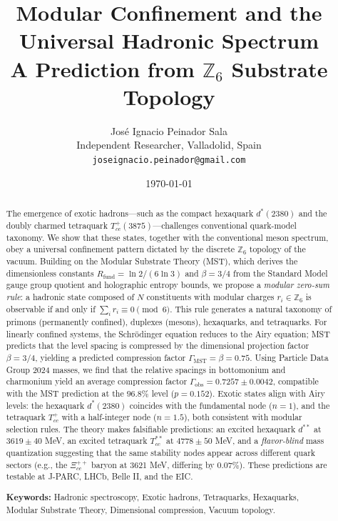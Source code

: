\documentclass[12pt,a4paper]{article}
\title{\textbf{Modular Confinement and the Universal Hadronic Spectrum}\\[0.5em]
\large A Prediction from \(\mathbb{Z}_6\) Substrate Topology}
\author{José Ignacio Peinador Sala\\
\small Independent Researcher, Valladolid, Spain\\
\small \texttt{joseignacio.peinador@gmail.com}}
\date{\today}
\theoremstyle{plain}
\theoremstyle{definition}
\theoremstyle{remark}
\begin{document}
\maketitle

\begin{abstract}
The emergence of exotic hadrons---such as the compact hexaquark \(d^*(2380)\) and the doubly charmed tetraquark \(T_{cc}^+(3875)\)---challenges conventional quark-model taxonomy. We show that these states, together with the conventional meson spectrum, obey a universal confinement pattern dictated by the discrete \(\mathbb{Z}_6\) topology of the vacuum. Building on the Modular Substrate Theory (MST), which derives the dimensionless constants \(R_{\text{fund}} = \ln 2/(6\ln 3)\) and \(\beta=3/4\) from the Standard Model gauge group quotient and holographic entropy bounds, we propose a \emph{modular zero-sum rule}: a hadronic state composed of \(N\) constituents with modular charges \(r_i \in \mathbb{Z}_6\) is observable if and only if \(\sum_i r_i \equiv 0 \pmod{6}\). This rule generates a natural taxonomy of primons (permanently confined), duplexes (mesons), hexaquarks, and tetraquarks. For linearly confined systems, the Schrödinger equation reduces to the Airy equation; MST predicts that the level spacing is compressed by the dimensional projection factor \(\beta=3/4\), yielding a predicted compression factor \(\Gamma_{\text{MST}} = \beta = 0.75\). Using Particle Data Group 2024 masses, we find that the relative spacings in bottomonium and charmonium yield an average compression factor \(\Gamma_{\text{obs}} = 0.7257 \pm 0.0042\), compatible with the MST prediction at the \(96.8\%\) level (\(p = 0.152\)). Exotic states align with Airy levels: the hexaquark \(d^*(2380)\) coincides with the fundamental node (\(n=1\)), and the tetraquark \(T_{cc}^+\) with a half-integer node (\(n=1.5\)), both consistent with modular selection rules. The theory makes falsifiable predictions: an excited hexaquark \(d^{**}\) at \(3619 \pm 40\) MeV, an excited tetraquark \(T_{cc}^{**}\) at \(4778 \pm 50\) MeV, and a \emph{flavor-blind} mass quantization suggesting that the same stability nodes appear across different quark sectors (e.g., the \(\Xi_{cc}^{++}\) baryon at 3621 MeV, differing by \(0.07\%\)). These predictions are testable at J-PARC, LHCb, Belle II, and the EIC.

\vspace{1em}
\noindent\textbf{Keywords:} Hadronic spectroscopy, Exotic hadrons, Tetraquarks, Hexaquarks, Modular Substrate Theory, Dimensional compression, Vacuum topology.
\end{abstract}
\end{document}
